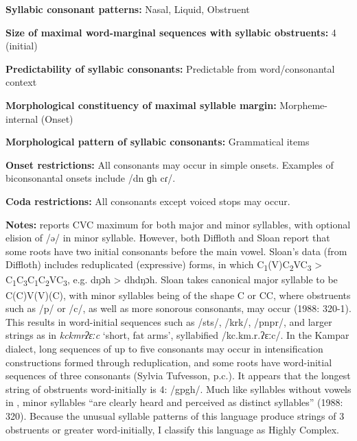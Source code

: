 \textbf{Syllabic consonant patterns:} Nasal, Liquid, Obstruent



\textbf{Size of maximal word{}-marginal sequences with syllabic obstruents:} 4 (initial)



\textbf{Predictability of syllabic consonants:} Predictable from word/consonantal context



\textbf{Morphological constituency of maximal syllable margin:} Morpheme-internal (Onset)



\textbf{Morphological pattern of syllabic consonants:} Grammatical items



\textbf{Onset restrictions:} All consonants may occur in simple onsets. Examples of biconsonantal onsets include /dn ɡh cɾ/.



\textbf{Coda restrictions:} All consonants except voiced stops may occur.



\textbf{Notes:} \citet{Philips2007} reports CVC maximum for both major and minor syllables, with optional elision of /ə/ in minor syllable. However, both Diffloth and Sloan report that some roots have two initial consonants before the main vowel. Sloan’s data (from Diffloth) includes reduplicated (expressive) forms, in which C\textsubscript{1}(V)C\textsubscript{2}VC\textsubscript{3} > C\textsubscript{1}C\textsubscript{3}C\textsubscript{1}C\textsubscript{2}VC\textsubscript{3}, e.g. dŋɔh > dhdŋɔh. Sloan takes canonical major syllable to be C(C)V(V)(C), with minor syllables being of the shape C or CC, where obstruents such as /p/ or /c/, as well as more sonorous consonants, may occur (1988: 320-1). This results in word-initial sequences such as /sts/, /krk/, /pnpr/, and larger strings as in \textit{kckmrʔɛːc} ‘short, fat arms’, syllabified /kc.km.r.ʔɛːc/. In the Kampar dialect, long sequences of up to five consonants may occur in intensification constructions formed through reduplication, and some roots have word-initial sequences of three consonants (Sylvia Tufvesson, p.c.). It appears that the longest string of obstruents word-initially is 4: /gpgh/. Much like syllables without vowels in ,  minor syllables “are clearly heard and perceived as distinct syllables” (1988: 320). Because the unusual syllable patterns of this language produce strings of 3 obstruents or greater word-initially, I classify this language as Highly Complex.



